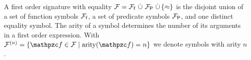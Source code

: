 
\begin{definition}\label{def:signature}
A
first order
{\myem signature} with equality
$\mathcal{F} = {\mathcal{F}_{\mathsf{f}}}\,\mathop{\dot\cup}\,{\mathcal{F}_{\mathsf{P}}}\,\mathop{\dot\cup}\,\{\approx\}$
is the disjoint union of
a set of {\myem function symbols} ${\mathcal{F}_{\mathsf{f}}}$,
a set of {\myem predicate symbols} ${\mathcal{F}_{\mathsf{P}}}$,
and one distinct equality symbol.
%
The {\myem arity} of a symbol determines the number of its arguments in a first order expression.
With $\mcFn = \{ \mcf\in\mcF \mid \arity(\mcf) = n \}$ we denote symbols with arity $n$.
\end{definition}
